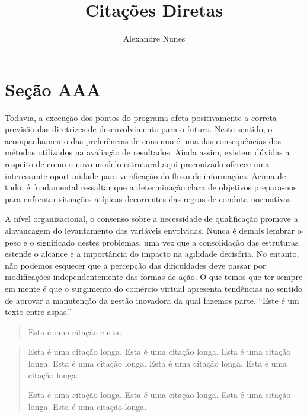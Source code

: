 \documentclass{article}
\begin{document}
	\title{\textbf{{\Huge Citações Diretas}}} %
	\author{Alexandre Nunes} %
	\date{\textsl{}} %
	\maketitle %
	\thispagestyle{empty} %
	\newpage
	
	\setcounter{page}{1} %
	\tableofcontents %
	\newpage

	\setcounter{page}{1} %
	
	\section{Seção AAA}
	
	Todavia, a execução dos pontos do programa afeta positivamente a correta previsão das diretrizes de desenvolvimento para o futuro. Neste sentido, o acompanhamento das preferências de consumo é uma das consequências dos métodos utilizados na avaliação de resultados. Ainda assim, existem dúvidas a respeito de como o novo modelo estrutural aqui preconizado oferece uma interessante oportunidade para verificação do fluxo de informações. Acima de tudo, é fundamental ressaltar que a determinação clara de objetivos prepara-nos para enfrentar situações atípicas decorrentes das regras de conduta normativas.
	
	A nível organizacional, o consenso sobre a necessidade de qualificação promove a alavancagem do levantamento das variáveis envolvidas. Nunca é demais lembrar o peso e o significado destes problemas, uma vez que a consolidação das estruturas estende o alcance e a importância do impacto na agilidade decisória. No entanto, não podemos esquecer que a percepção das dificuldades deve passar por modificações independentemente das formas de ação. O que temos que ter sempre em mente é que o surgimento do comércio virtual apresenta tendências no sentido de aprovar a manutenção da gestão inovadora da qual fazemos parte. 
	\enquote{Este é um texto entre aspas.}

	\begin{quote} %
		Esta é uma citação curta.
	\end{quote}

	\begin{quotation} %
		Esta é uma citação longa. Esta é uma citação longa. Esta é uma citação longa. Esta é uma citação longa. Esta é uma citação longa. Esta é uma citação longa.
		
		Esta é uma citação longa. Esta é uma citação longa. Esta é uma citação longa. Esta é uma citação longa.
	\end{quotation}
\end{document}
